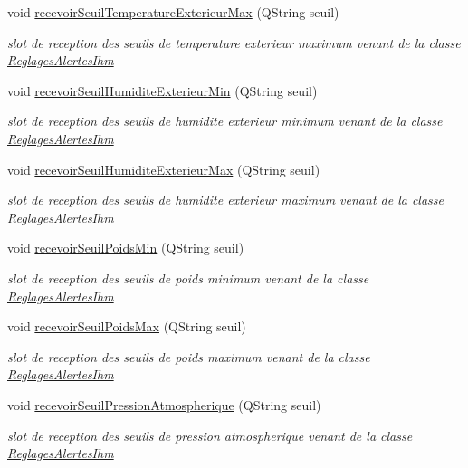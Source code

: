 \begin{DoxyCompactItemize}
void \hyperlink{class_alertes_af896e03da2f2ec319d410fb8dcc89e0e}{recevoir\+Seuil\+Temperature\+Exterieur\+Max} (Q\+String seuil)
\begin{DoxyCompactList}\small\item\em slot de reception des seuils de temperature exterieur maximum venant de la classe \hyperlink{class_reglages_alertes_ihm}{Reglages\+Alertes\+Ihm} \end{DoxyCompactList}\item 
void \hyperlink{class_alertes_a021d167be6c98d9b0718bb9c7209b47e}{recevoir\+Seuil\+Humidite\+Exterieur\+Min} (Q\+String seuil)
\begin{DoxyCompactList}\small\item\em slot de reception des seuils de humidite exterieur minimum venant de la classe \hyperlink{class_reglages_alertes_ihm}{Reglages\+Alertes\+Ihm} \end{DoxyCompactList}\item 
void \hyperlink{class_alertes_a8c8500d99314034be3c01a871f209fb8}{recevoir\+Seuil\+Humidite\+Exterieur\+Max} (Q\+String seuil)
\begin{DoxyCompactList}\small\item\em slot de reception des seuils de humidite exterieur maximum venant de la classe \hyperlink{class_reglages_alertes_ihm}{Reglages\+Alertes\+Ihm} \end{DoxyCompactList}\item 
void \hyperlink{class_alertes_ab6a15b0c8387a2cdf47dacce92c60383}{recevoir\+Seuil\+Poids\+Min} (Q\+String seuil)
\begin{DoxyCompactList}\small\item\em slot de reception des seuils de poids minimum venant de la classe \hyperlink{class_reglages_alertes_ihm}{Reglages\+Alertes\+Ihm} \end{DoxyCompactList}\item 
void \hyperlink{class_alertes_a77b71a5bc047ced8d09f59a521f58616}{recevoir\+Seuil\+Poids\+Max} (Q\+String seuil)
\begin{DoxyCompactList}\small\item\em slot de reception des seuils de poids maximum venant de la classe \hyperlink{class_reglages_alertes_ihm}{Reglages\+Alertes\+Ihm} \end{DoxyCompactList}\item 
void \hyperlink{class_alertes_a4496c251e1cde3e8c6beee64bad53fe3}{recevoir\+Seuil\+Pression\+Atmospherique} (Q\+String seuil)
\begin{DoxyCompactList}\small\item\em slot de reception des seuils de pression atmospherique venant de la classe \hyperlink{class_reglages_alertes_ihm}{Reglages\+Alertes\+Ihm} \end{DoxyCompactList}\item 

\end{DoxyCompactItemize}
